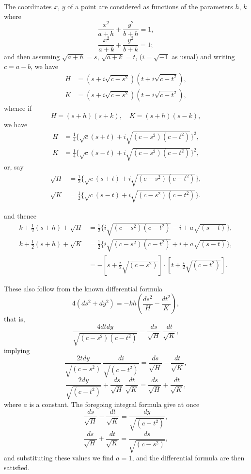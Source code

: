 \documentclass[11pt,a4paper]{book}
\begin{document}
The coordinates $x$, $y$ of a point are considered as functions of the parameters
$h$, $k$ where
\[
\frac{x^2}{a + h} + \frac{y^2}{b + h} = 1,
\]
\[
\frac{x^2}{a + k} + \frac{y^2}{b + k} = 1;
\]
and then assuming $\sqrt{a + h} = s$, $\sqrt{a + k} = t$, ($i = \sqrt{-1}$ as usual) and writing $c = a - b$,
we have
\begin{align*}
H &= (s + i \sqrt{c - s^2})(t + i \sqrt{c - t^2}), \\
K &= (s + i \sqrt{c - s^2})(t - i \sqrt{c - t^2}),
\end{align*}
whence if
\[
H = (s + h)(s + k), \quad K = (s + h)(s - k),
\]
we have
\begin{align*}
H &= \tfrac{1}{4}\{\sqrt{c}(s + t) + i \sqrt{(c - s^2)(c - t^2)}\}^2, \\
K &= \tfrac{1}{4}\{\sqrt{c}(s - t) + i \sqrt{(c - s^2)(c - t^2)}\}^2,
\end{align*}
or, say
\begin{align*}
\sqrt{H} &= \tfrac{1}{2}\{\sqrt{c}(s + t) + i \sqrt{(c - s^2)(c - t^2)}\}, \\
\sqrt{K} &= \tfrac{1}{2}\{\sqrt{c}(s - t) + i \sqrt{(c - s^2)(c - t^2)}\}.
\end{align*}

\clearpage

\noindent
and thence
\begin{align*}
k + \tfrac{1}{2}(s + h) + \sqrt{H} &= \tfrac{1}{2}\{i \sqrt{(c - s^2)(c - t^2)} - i + a \sqrt{(s - t)}\}, \\
k + \tfrac{1}{2}(s + h) + \sqrt{K} &= \tfrac{1}{2}\{i \sqrt{(c - s^2)(c - t^2)} + i + a \sqrt{(s - t)}\}, \\
&= -[s + \tfrac{i}{2}\sqrt{(c - s^2)}] \cdot [t + \tfrac{i}{2}\sqrt{(c - t^2)}].
\end{align*}

These also follow from the known differential formula
\[
4(ds^2 + dy^2) = -k h \left(\frac{ds^2}{H} - \frac{dt^2}{K}\right),
\]
that is,
\[
\frac{4 dt dy}{\sqrt{(c - s^2)(c - t^2)}} = \frac{ds}{\sqrt{H}}\;\frac{dt}{\sqrt{K}},
\]
implying
\[
\frac{2 t dy}{\sqrt{(c - s^2)}}\,\frac{di}{\sqrt{(c - t^2)}} = \frac{ds}{\sqrt{H}} - \frac{dt}{\sqrt{K}},
\]
\[
\frac{2 dy}{\sqrt{(c - t^2)}} + \frac{ds}{\sqrt{H}}\,\frac{dt}{\sqrt{K}} = \frac{ds}{\sqrt{H}} + \frac{dt}{\sqrt{K}},
\]
where $a$ is a constant.  The foregoing integral formula give at once
\[
\frac{ds}{\sqrt{H}} - \frac{dt}{\sqrt{K}} = \frac{dy}{\sqrt{(c - t^2)}},
\]
\[
\frac{ds}{\sqrt{H}} + \frac{dt}{\sqrt{K}} = \frac{ds}{\sqrt{(c - s^2)}},
\]
and substituting these values we find $a = 1$, and the differential formula are then
satisfied.
\end{document}
